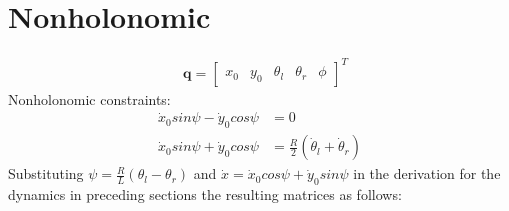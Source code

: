 \documentclass[a4paper,10pt]{article}
\begin{document}
\section{Nonholonomic}
\begin{align}
 &\mathbf{q} = \left[\begin{matrix} x_0 & y_0 & \theta_l & \theta_r & \phi \end{matrix}\right]^T \nonumber
\end{align}
Nonholonomic constraints:
\begin{align}
 \dot{x}_0sin\psi-\dot{y}_0cos\psi &= 0 \nonumber \\
 \dot{x}_0sin\psi+\dot{y}_0cos\psi &= \frac{R}{2}(\dot\theta_l+\dot\theta_r) 
\end{align}
Substituting $\psi = \frac{R}{L}(\theta_l-\theta_r)$ and $\dot{x} = \dot{x}_0cos\psi+\dot{y}_0sin\psi$ in the derivation
for the dynamics in preceding sections the resulting matrices as follows:
\end{document}
